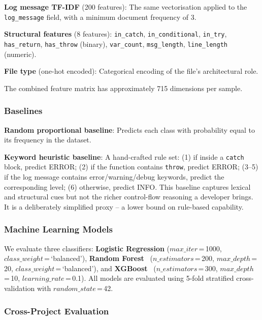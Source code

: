 \documentclass[10pt,twocolumn]{article}
\begin{document}
\textbf{Log message TF-IDF} (200 features): The same vectorisation applied to the \texttt{log\_message} field, with a minimum document frequency of 3.

\textbf{Structural features} (8 features): \texttt{in\_catch}, \texttt{in\_conditional}, \texttt{in\_try}, \texttt{has\_return}, \texttt{has\_throw} (binary), \texttt{var\_count}, \texttt{msg\_length}, \texttt{line\_length} (numeric).

\textbf{File type} (one-hot encoded): Categorical encoding of the file's architectural role.

The combined feature matrix has approximately 715 dimensions per sample.

\subsubsection{Baselines}

\textbf{Random proportional baseline}: Predicts each class with probability equal to its frequency in the dataset.

\textbf{Keyword heuristic baseline}: A hand-crafted rule set: (1) if inside a \texttt{catch} block, predict ERROR; (2) if the function contains \texttt{throw}, predict ERROR; (3--5) if the log message contains error/warning/debug keywords, predict the corresponding level; (6) otherwise, predict INFO. This baseline captures lexical and structural cues but not the richer control-flow reasoning a developer brings. It is a deliberately simplified proxy -- a lower bound on rule-based capability.

\subsubsection{Machine Learning Models}

We evaluate three classifiers: \textbf{Logistic Regression} ($max\_iter$\,=\,1000, $class\_weight$\,=\,`balanced'), \textbf{Random Forest}~\cite{breiman2001} ($n\_estimators$\,=\,200, $max\_depth$\,=\,20, $class\_weight$\,=\,`balanced'), and \textbf{XGBoost}~\cite{chen2016} ($n\_estimators$\,=\,300, $max\_depth$\,=\,10, $learning\_rate$\,=\,0.1). All models are evaluated using 5-fold stratified cross-validation with $random\_state$\,=\,42.

\subsubsection{Cross-Project Evaluation}
\end{document}
